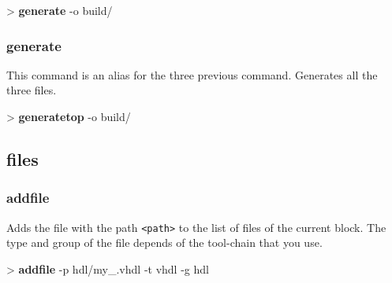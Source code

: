 \documentclass[10pt,a4paper]{article}
\begin{document}
\begin{sampletitle}
> \textbf{\tool{} generate\kind{}} -o build/
\end{sampletitle}

\subsubsection{generate}

This command is an alias for the three previous command. Generates all the three files.\\


\begin{sampletitle}
> \textbf{\tool{} generatetop} -o build/
\end{sampletitle}


\subsection{files}
\subsubsection{addfile}
\label{subsec:addfile}

Adds the file with the path \texttt{<path>} to the list of files of the current \kind{} block. The type and group of the file depends of the tool-chain that you use.\\


\begin{sampletitle}
> \textbf{\tool{} addfile} -p hdl/my\_\kind{}.vhdl -t vhdl -g hdl
\end{sampletitle}
\end{document}
